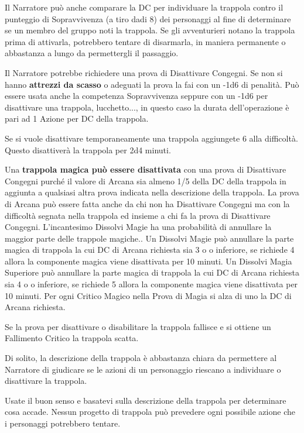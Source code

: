 \begin{multicols}{2}
Il Narratore può anche comparare la DC per individuare la trappola contro il punteggio di Sopravvivenza (a tiro dadi 8) dei personaggi al fine di determinare se un membro del gruppo noti la trappola. Se gli avventurieri notano la trappola prima di attivarla, potrebbero tentare di disarmarla, in maniera permanente o abbastanza a lungo da permettergli il passaggio.

Il Narratore potrebbe richiedere una prova di Disattivare Congegni. Se non si hanno \textbf{attrezzi da scasso} o adeguati la prova la fai con un -1d6 di penalità. Può essere usata anche la competenza Sopravvivenza seppure con un -1d6 per disattivare una trappola, lucchetto..., in questo caso la durata dell'operazione è pari ad 1 Azione per DC della trappola.

Se si vuole disattivare temporaneamente una trappola aggiungete 6 alla difficoltà. Questo disattiverà la trappola per 2d4 minuti.

Una \textbf{trappola magica può essere disattivata} con una prova di Disattivare Congegni purché il valore di Arcana sia almeno 1/5 della DC della trappola in aggiunta a qualsiasi altra prova indicata nella descrizione della trappola. La prova di Arcana può essere fatta anche da chi non ha Disattivare Congegni ma con la difficoltà segnata nella trappola ed insieme a chi fa la prova di Disattivare Congegni. L'incantesimo Dissolvi Magie ha una probabilità di annullare la maggior parte delle trappole magiche.. Un Dissolvi Magie può annullare la parte magica di trappola la cui DC di Arcana richiesta sia 3 o o inferiore, se richiede 4 allora la componente magica viene disattivata per 10 minuti. Un Dissolvi Magia Superiore può annullare la parte magica di trappola la cui DC di Arcana richiesta sia 4 o o inferiore, se richiede 5 allora la componente magica viene disattivata per 10 minuti. Per ogni Critico Magico nella Prova di Magia si alza di uno la DC di Arcana richiesta.

Se la prova per disattivare o disabilitare la trappola fallisce e si ottiene un Fallimento Critico la trappola scatta.

Di solito, la descrizione della trappola è abbastanza chiara da permettere al Narratore di giudicare se le azioni di un personaggio riescano a individuare o disattivare la trappola.

Usate il buon senso e basatevi sulla descrizione della trappola per determinare cosa accade. Nessun progetto di trappola può prevedere ogni possibile azione che i personaggi potrebbero tentare.


\end{multicols}
